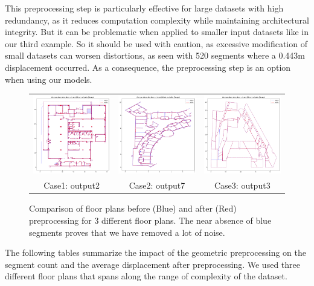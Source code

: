 \documentclass[11pt]{article}
\begin{document}
This preprocessing step is particularly effective for large datasets with high 
redundancy, as it reduces computation complexity while maintaining architectural 
integrity. But it can be problematic when applied to smaller input datasets like 
in our third example. So it should be used with caution, as excessive modification 
of small datasets can worsen distortions, as seen with 520 segments where a 0.443m 
displacement occurred. As a consequence, the preprocessing step is an option when
using our models.

\begin{figure}[h]
    \centering
    \begin{tabular}{ccc}
        \includegraphics[width=0.32\linewidth]{figures/avant_apres_pretraitement2.png}
        &
        \includegraphics[width=0.32\linewidth]{figures/avant_apres_pretraitement7.png}
        &
        \includegraphics[width=0.32\linewidth]{figures/avant_apres_pretraitement3.png}
        \\
        Case1: output2 & Case2: output7 & Case3: output3 
    \end{tabular}

    \caption{Comparison of floor plans before (Blue) and after (Red) preprocessing 
    for 3 different floor plans. The near absence of blue segments proves that
    we have removed a lot of noise.}
    \label{fig:geojson_comparison}
\end{figure}
The following tables summarize the impact of the geometric preprocessing on the
segment count and the average displacement after preprocessing. We used three 
different floor plans that spans along the range of complexity of the dataset.
\end{document}
